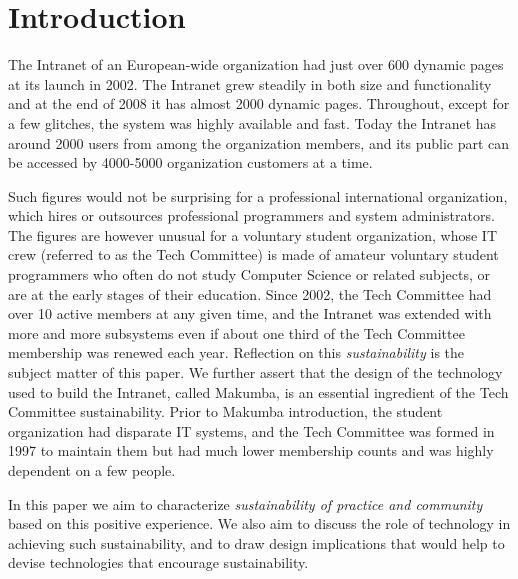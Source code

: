 \documentclass{acm_proc_article-sp}
\begin{document}



\section{Introduction}\label{sec:introduction}
The Intranet of an European-wide organization had just over 600 dynamic pages at its launch in 2002. The Intranet grew steadily in both size and functionality and at the end of 2008 it has almost 2000 dynamic pages. Throughout, except for a few glitches, the system was highly available and fast. Today the Intranet has around 2000 users from among the organization members, and its public part can be accessed by 4000-5000 organization customers at a time.

Such figures would not be surprising for a professional international organization, which hires or outsources professional programmers and system administrators. 
The figures are however unusual for a voluntary student organization, whose IT crew (referred to as the Tech Committee) is made of amateur voluntary student programmers who often do not study Computer Science or related subjects, or are at the early stages of their education.  
Since 2002, the Tech Committee had over 10 active members at any given time, and the Intranet was extended with more and more subsystems even if about one third of the Tech Committee membership was renewed each year. Reflection on this {\it sustainability} is the subject matter of this paper. We further assert that the design of the technology used to build the Intranet, called Makumba, is an essential ingredient of the Tech Committee sustainability.
Prior to Makumba introduction, the student organization had disparate IT systems, and the Tech Committee was formed in 1997 to maintain them but had much lower membership counts and was highly dependent on a few people.

In this paper we aim to characterize {\it sustainability of practice and community} based on this positive experience. We also aim to discuss the role of technology in achieving such sustainability, and to draw design implications that would help to devise technologies that encourage sustainability. 
\end{document}
